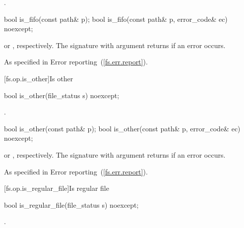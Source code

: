\begin{itemdescr}
\pnum
\returns {}.
\end{itemdescr}


%
\begin{itemdecl}
bool is_fifo(const path& p);
bool is_fifo(const path& p, error_code& ec) noexcept;
\end{itemdecl}

\begin{itemdescr}
\pnum
\returns {} or , respectively.
The signature with argument  returns  if an error occurs.

\pnum
\throws As specified in Error reporting~(\ref{fs.err.report}).
\end{itemdescr}


[fs.op.is_other]{Is other}

%
\begin{itemdecl}
bool is_other(file_status s) noexcept;
\end{itemdecl}

\begin{itemdescr}
\pnum
\returns {}.
\end{itemdescr}

%
\begin{itemdecl}
bool is_other(const path& p);
bool is_other(const path& p, error_code& ec) noexcept;
\end{itemdecl}

\begin{itemdescr}
\pnum
\returns {} or ,
  respectively. The signature with argument  returns 
  if an error occurs.

\pnum
\throws As specified in Error reporting~(\ref{fs.err.report}).
\end{itemdescr}


[fs.op.is_regular_file]{Is regular file}

%
\begin{itemdecl}
bool is_regular_file(file_status s) noexcept;
\end{itemdecl}

\begin{itemdescr}
\pnum
\returns {}.
\end{itemdescr}

